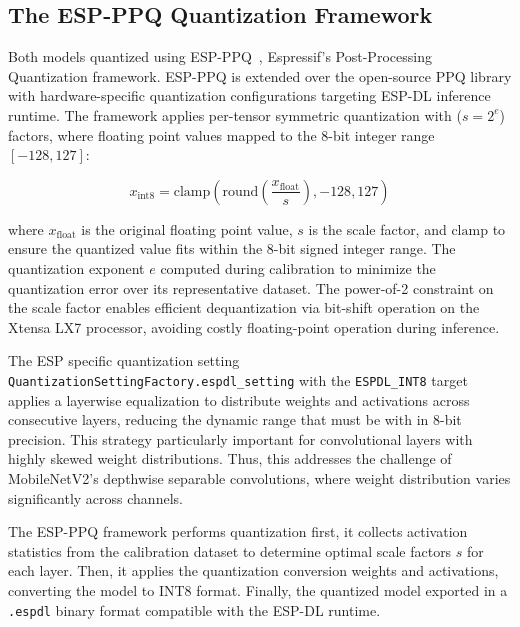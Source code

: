 \subsection{The ESP-PPQ Quantization Framework}
\label{subsec:esp_ppq}

Both models quantized using ESP-PPQ~\cite{esp_dl_mobilenetv2_tutorial}, Espressif's Post-Processing Quantization framework. ESP-PPQ is extended over the open-source PPQ library with hardware-specific quantization configurations targeting ESP-DL inference runtime. The framework applies per-tensor symmetric quantization with ($s = 2^e$) factors, where floating point values mapped to the 8-bit integer range $[-128, 127]$:

\begin{equation}
x_{\text{int8}} = \text{clamp}\left(\text{round}\left(\frac{x_{\text{float}}}{s}\right), -128, 127\right)
\label{eq:quantization}
\end{equation}

where $x_{\text{float}}$ is the original floating point value, $s$ is the scale factor, and $\text{clamp}$ to ensure the quantized value fits within the 8-bit signed integer range. The quantization exponent $e$ computed during calibration to minimize the quantization error over its representative dataset. The power-of-2 constraint on the scale factor enables efficient dequantization via bit-shift operation on the Xtensa LX7 processor, avoiding costly floating-point operation during inference.

The ESP specific quantization setting \texttt{QuantizationSettingFactory.espdl\_setting} with the \texttt{ESPDL\_INT8} target applies a layerwise equalization to distribute weights and activations across consecutive layers, reducing the dynamic range that must be with in 8-bit precision. This strategy particularly important for convolutional layers with highly skewed weight distributions. Thus, this addresses the challenge of MobileNetV2's depthwise separable convolutions, where weight distribution varies significantly across channels.

The ESP-PPQ framework performs quantization first, it collects activation statistics from the calibration dataset to determine optimal scale factors $s$ for each layer. Then, it applies the quantization conversion weights and activations, converting the model to INT8 format. Finally, the quantized model exported in a \texttt{.espdl} binary format compatible with the ESP-DL runtime. 




